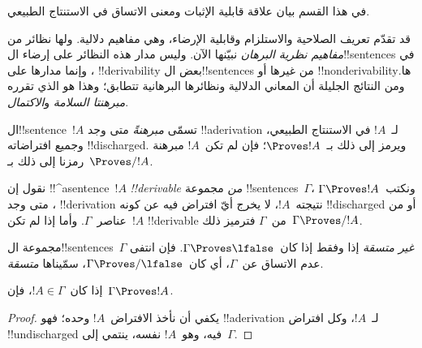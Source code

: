 \documentclass[../../../include/open-logic-section]{subfiles}
\begin{document}
      {}
      {}


\begin{editorial}
في هذا القسم بيان علاقة قابلية الإثبات ومعنى الاتساق في الاستنتاج
الطبيعي.
\end{editorial}

\begin{explain}
قد تقدّم تعريف الصلاحية والاستلزام وقابلية الإرضاء، وهي مفاهيم دلالية.
ولها نظائر من \emph{مفاهيم نظرية البرهان} نبيّنها الآن. وليس مدار هذه
النظائر على إرضاء ال!!{sentence}s في
، وإنما مدارها على
!!{derivability} بعض ال!!{sentence}s من غيرها أو !!{nonderivability}ها.
ومن النتائج الجليلة أن المعاني الدلالية ونظائرها البرهانية تتطابق؛
وهذا هو الذي تقرره \emph{مبرهنتا السلامة} و\emph{الاكتمال}.
\end{explain}


\begin{defn}[المبرهنات]
ال!!{sentence}~$!A$ تسمّى \emph{مبرهنةً} متى وجد !!a{derivation} لـ~$!A$
في الاستنتاج الطبيعي، وجميع افتراضاته !!{discharged}. ويرمز إلى ذلك
بـ~$\Proves !A$؛ فإن لم تكن~$!A$ مبرهنة رمزنا إلى ذلك بـ~$\Proves/ !A$.
\end{defn}

\begin{defn}[!!^{derivability}]
نقول إن !!^a{sentence}~$!A$ \emph{!!{derivable} من} مجموعة
!!{sentence}s~$\Gamma$، ونكتب~$\Gamma \Proves !A$، متى وجد
!!{derivation} نتيجته~$!A$، لا يخرج أيّ افتراض فيه عن كونه
!!{discharged} أو من عناصر~$\Gamma$. وأما إذا لم تكن~$!A$
!!{derivable} من~$\Gamma$ فترميز ذلك~$\Gamma \Proves/ !A$.
\end{defn}

\begin{defn}[الاتساق]
مجموعة ال!!{sentence}s~$\Gamma$ \emph{غير متسقة} إذا وفقط إذا
كان~$\Gamma \Proves \lfalse$. فإن انتفى عدم الاتساق عن~$\Gamma$،
أي كان~$\Gamma \Proves/ \lfalse$، سمّيناها \emph{متسقة}.
\end{defn}

\begin{prop}[الانعكاسية]
إذا كان~$!A \in \Gamma$، فإن~$\Gamma \Proves !A$.
\end{prop}

\begin{proof}
يكفي أن نأخذ الافتراض~$!A$ وحده؛ فهو !!a{derivation} لـ~$!A$، وكل
افتراض !!{undischarged} فيه، وهو~$!A$ نفسه، ينتمي إلى~$\Gamma$.
\end{proof}
  
\end{document}
